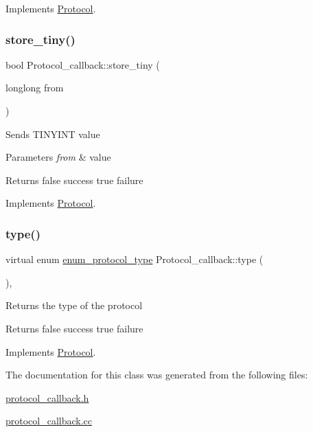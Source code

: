 Implements \mbox{\hyperlink{classProtocol}{Protocol}}.

\mbox{\label{classProtocol__callback_af25c2ef62aa546adf96045007292c3d2}} 
\subsubsection{\texorpdfstring{store\+\_\+tiny()}{store\_tiny()}}
{\footnotesize\ttfamily bool Protocol\+\_\+callback\+::store\+\_\+tiny (\begin{DoxyParamCaption}\item[{longlong}]{from }\end{DoxyParamCaption})\hspace{0.3cm}{\ttfamily [virtual]}}

Sends T\+I\+N\+Y\+I\+NT value


\begin{DoxyParams}{Parameters}
{\em from} & value\\
\hline
\end{DoxyParams}
\begin{DoxyReturn}{Returns}
false success true failure 
\end{DoxyReturn}


Implements \mbox{\hyperlink{classProtocol}{Protocol}}.

\mbox{\label{classProtocol__callback_a35ef2c30f27cf89c4b0c8ddf1cf40917}} 
\subsubsection{\texorpdfstring{type()}{type()}}
{\footnotesize\ttfamily virtual enum \mbox{\hyperlink{classProtocol_ab1d147a8122f4ea4f8516ee23c514b02}{enum\+\_\+protocol\+\_\+type}} Protocol\+\_\+callback\+::type (\begin{DoxyParamCaption}{ }\end{DoxyParamCaption})\hspace{0.3cm}{\ttfamily [inline]}, {\ttfamily [virtual]}}

Returns the type of the protocol

\begin{DoxyReturn}{Returns}
false success true failure 
\end{DoxyReturn}


Implements \mbox{\hyperlink{classProtocol}{Protocol}}.



The documentation for this class was generated from the following files\+:\begin{DoxyCompactItemize}
\item 
\mbox{\hyperlink{protocol__callback_8h}{protocol\+\_\+callback.\+h}}\item 
\mbox{\hyperlink{protocol__callback_8cc}{protocol\+\_\+callback.\+cc}}\end{DoxyCompactItemize}
